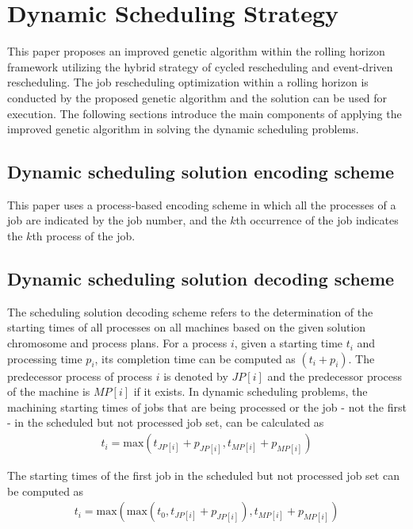 \section{Dynamic Scheduling Strategy}
This paper proposes an improved genetic algorithm within the rolling horizon framework utilizing the hybrid strategy of cycled rescheduling and event-driven rescheduling.
The job rescheduling optimization within a rolling horizon is conducted by the proposed genetic algorithm and the solution can be used for execution.
The following sections introduce the main components of applying the improved genetic algorithm in solving the dynamic scheduling problems.



\subsection{Dynamic scheduling solution encoding scheme}
This paper uses a process-based encoding scheme in which all the processes of a job are indicated by the job number, and the $k$th occurrence of the job indicates the $k$th process of the job.



\subsection{Dynamic scheduling solution decoding scheme} 
The scheduling solution decoding scheme refers to the determination of the starting times of all processes on all machines based on the given solution chromosome and process plans.
For a process $i$, given a starting time $t_i$ and processing time $p_i$, its completion time can be computed as $(t_i + p_i)$.
The predecessor process of process $i$ is denoted by $JP[i]$ and the predecessor process of the machine is $MP[i]$ if it exists.
In dynamic scheduling problems, the machining starting times of jobs that are being processed or the job - not the first - in the scheduled but not processed job set, can be calculated as 
\begin{align}
	t_i = \text{max}(t_{JP[i]} + p_{JP[i]}, t_{MP[i]} + p_{MP[i]})
\end{align}

The starting times of the first job in the scheduled but not processed job set can be computed as
\begin{align}
	t_i = \text{max}(\text{max}(t_0, t_{JP[i]} + p_{JP[i]}), t_{MP[i]} + p_{MP[i]})
\end{align}

